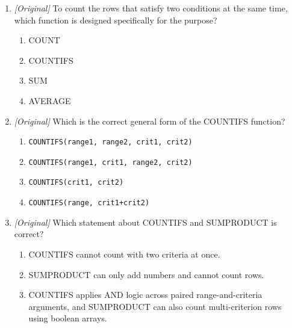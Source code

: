 \documentclass[11pt]{article}
\begin{document}
\begin{enumerate}[label=\textbf{Q\arabic*.}, leftmargin=*]
  \begin{enumerate}[label=\Roman*.]
    \item A PivotTable summarises data but is not the source table itself.
    \item A PivotChart is linked to a PivotTable.
    \item A filter permanently deletes the rows it hides.
  \end{enumerate}
  \begin{enumerate}[label=\Alph*.]
    \item I only
    \item I and II only
    \item II and III only
    \item I, II, and III
  \end{enumerate}
\item \textit{[Original]} To count the rows that satisfy two conditions at the
  same time, which function is designed specifically for the purpose?
  \begin{enumerate}[label=\Alph*.]
    \item COUNT
    \item COUNTIFS
    \item SUM
    \item AVERAGE
  \end{enumerate}
\item \textit{[Original]} Which is the correct general form of the COUNTIFS
  function?
  \begin{enumerate}[label=\Alph*.]
    \item \texttt{COUNTIFS(range1, range2, crit1, crit2)}
    \item \texttt{COUNTIFS(range1, crit1, range2, crit2)}
    \item \texttt{COUNTIFS(crit1, crit2)}
    \item \texttt{COUNTIFS(range, crit1+crit2)}
  \end{enumerate}
\item \textit{[Original]} Which statement about COUNTIFS and SUMPRODUCT is
  correct?
  \begin{enumerate}[label=\Alph*.]
    \item COUNTIFS cannot count with two criteria at once.
    \item SUMPRODUCT can only add numbers and cannot count rows.
    \item COUNTIFS applies AND logic across paired range-and-criteria
      arguments, and SUMPRODUCT can also count multi-criterion rows using
      boolean arrays.

\end{enumerate}
\end{enumerate}
\end{document}
